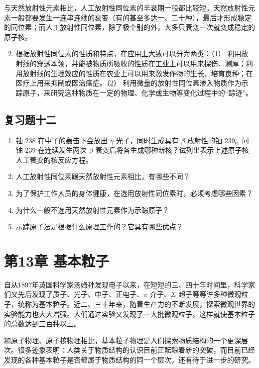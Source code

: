 与天然放射性元素相比，人工放射性同位素的半衰期一般都比较短。天然放射性元素一般都要发生一连串连续的衰变（有的甚至多达一、二十种），最后才形成稳定的同位素；而人工放射性同位素，除了极个别的外，大多只衰变一次就变成稳定的原子核。

\begin{enumerate}
\setcounter{enumi}{1}
\item
  根据放射性同位素的性质和特点，在应用上大致可以分为两类：（1）
  利用放射线的穿透本领，并能被物质所吸收的性质在工业上可以用来探伤、测厚；利用放射线的生理效应的性质在农业上可以用来激发作物的生长，培育良种；在医疗上用来抑制或医治癌症。（2）
  利用微量的放射性同位素渗入物质作为示踪原子，来研究这种物质在一定的物理、化学或生物等变化过程中的``踪迹''。
\end{enumerate}

\section{复习题十二}

\begin{enumerate}
\item
  铀 238 在中子的轰击下会放出 \(\gamma\) 光子，同时生成具有 \(\beta\)
  放射性的铀 239。问铀 239 在连续发生两次 \(\beta\)
  衰变后将各生成哪种新核？试列出表示上述原子核人工衰变的核反应方程。
\item
  人工放射性同位素跟天然放射性元素相比，有哪些不同？
\item
  为了保护工作人员的身体健康，在选用放射性同位素时，必须考虑哪些因素？
\item
  为什么一般不选用天然放射性元素作为示踪原子？
\item
  示踪原子法是根据什么原理工作的？它具有哪些优点？
\end{enumerate}

\chapter{第13章 基本粒子}

自从1897年英国科学家汤姆孙发现电子以来，在短短的三、四十年时间里，科学家们又先后发现了质子、光子、中子、正电子、\(\pi\)
介子、\(\Sigma\)
超子等等许多种微观粒子，统称为基本粒子。近二、三十年来，随着生产力的不断发展，探索微观世界的实验能力也大大增强。人们通过实验又发现了一大批微观粒子，这样就使基本粒子的总数达到三百种以上。

和原子物理、原子核物理相比，基本粒子物理是人们探索物质结构的一个更深层次。很多迹象表明：人类关于物质结构的认识目前正酝酿着新的突破，而目前已经发现的各种基本粒子是否都属于物质结构的同一个层次，还有待于进一步的研究。

